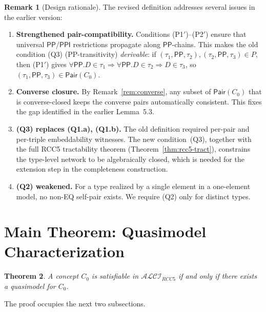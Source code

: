 \documentclass[a4paper,11pt]{article}
\newtheorem{theorem}{Theorem}[section]
\theoremstyle{definition}
\newtheorem{remark}[theorem]{Remark}
\newcommand{\ALCIRCC}[1]{\ensuremath{\mathcal{ALCI}_{\mathit{RCC#1}}}}
\newcommand{\PP}{\ensuremath{\mathsf{PP}}}
\newcommand{\PPI}{\ensuremath{\mathsf{PPI}}}
\newcommand{\Pair}{\ensuremath{\mathsf{Pair}}}
\begin{document}
\begin{remark}[Design rationale]
\label{rem:quasimodel-rationale}
The revised definition addresses several issues in the earlier
version:

\begin{enumerate}[nosep]
  \item \textbf{Strengthened pair-compatibility.}\; Conditions
    (P1$'$)--(P2$'$) ensure that universal $\PP$/$\PPI$ restrictions
    propagate along $\PP$-chains.  This makes the old condition (Q3)
    (PP-transitivity) \emph{derivable}: if $(\tau_1, \PP, \tau_2),
    (\tau_2, \PP, \tau_3) \in P$, then (P1$'$) gives $\forall \PP.D
    \in \tau_1 \Rightarrow \forall \PP.D \in \tau_2 \Rightarrow D
    \in \tau_3$, so $(\tau_1, \PP, \tau_3) \in \Pair(C_0)$.

  \item \textbf{Converse closure.}\; By Remark~\ref{rem:converse},
    any subset of $\Pair(C_0)$ that is converse-closed keeps the
    converse pairs automatically consistent.  This fixes the gap
    identified in the earlier Lemma~5.3.

  \item \textbf{(Q3) replaces (Q1.a), (Q1.b).}\; The old definition
    required per-pair and per-triple embeddability witnesses.  The new
    condition~(Q3), together with the full RCC5 tractability theorem
    (Theorem~\ref{thm:rcc5-tract}), constrains the type-level network
    to be algebraically closed, which is needed for the extension step
    in the completeness construction.

  \item \textbf{(Q2) weakened.}\; For a type realized by a single
    element in a one-element model, no non-EQ self-pair exists.  We
    require (Q2) only for distinct types.
\end{enumerate}
\end{remark}

\section{Main Theorem: Quasimodel Characterization}
\label{sec:main}

\begin{theorem}
\label{thm:main}
A concept $C_0$ is satisfiable in $\ALCIRCC{5}$ if and only if there
exists a quasimodel for $C_0$.
\end{theorem}

The proof occupies the next two subsections.
\end{document}
